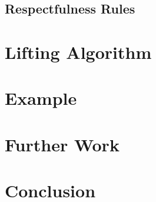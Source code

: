 \documentclass[]{article}
\theoremstyle{definition}
\begin{document}
\subsection{Respectfulness Rules}

\section{Lifting Algorithm}

\section{Example}

\section{Further Work}

\section{Conclusion}
\end{document}

